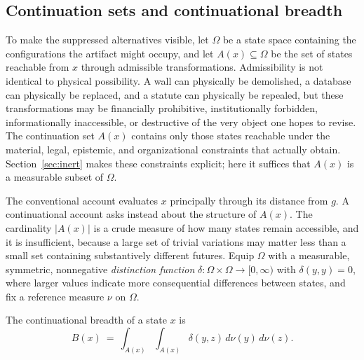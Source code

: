 \subsection{Continuation sets and continuational breadth}

To make the suppressed alternatives visible, let $\Omega$ be a state space containing the configurations the artifact might occupy, and let $A(x)\subseteq\Omega$ be the set of states reachable from $x$ through admissible transformations. Admissibility is not identical to physical possibility. A wall can physically be demolished, a database can physically be replaced, and a statute can physically be repealed, but these transformations may be financially prohibitive, institutionally forbidden, informationally inaccessible, or destructive of the very object one hopes to revise. The continuation set $A(x)$ contains only those states reachable under the material, legal, epistemic, and organizational constraints that actually obtain. Section~\ref{sec:inert} makes these constraints explicit; here it suffices that $A(x)$ is a measurable subset of $\Omega$.

The conventional account evaluates $x$ principally through its distance from $g$. A continuational account asks instead about the structure of $A(x)$. The cardinality $|A(x)|$ is a crude measure of how many states remain accessible, and it is insufficient, because a large set of trivial variations may matter less than a small set containing substantively different futures. Equip $\Omega$ with a measurable, symmetric, nonnegative \emph{distinction function} $\delta:\Omega\times\Omega\to[0,\infty)$ with $\delta(y,y)=0$, where larger values indicate more consequential differences between states, and fix a reference measure $\nu$ on $\Omega$.

\begin{definition}\label{def:breadth}
The continuational breadth of a state $x$ is
\begin{equation}\label{eq:breadth}
B(x)\ =\ \int_{A(x)}\int_{A(x)}\delta(y,z)\,d\nu(y)\,d\nu(z).
\end{equation}
\end{definition}

